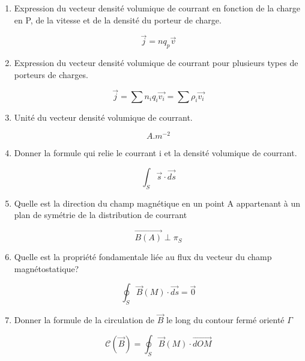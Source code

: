 \documentclass{article}
\begin{document}
\begin{enumerate}[label=\arabic{enumi} - , left=0pt, itemsep=1em]
    \item Expression du vecteur densité volumique de courrant en fonction de la charge en P, de la vitesse et de la densité du porteur de charge.\par
    \begin{solution}
         \[ \vec{j} = n q_p \vec{v} \]
    \end{solution}

    \item Expression du vecteur densité volumique de courrant pour plusieurs types de porteurs de charges.\par
    \begin{solution}
         \[ \vec{j} = \sum n_i q_i\vec{v_i} = \sum \rho_i\vec{v_i} \]
    \end{solution}

    \item Unité du vecteur densité volumique de courrant.\par
    \begin{solution}
         \[ A.m^{-2} \]
    \end{solution}

    \item Donner la formule qui relie le courrant i et la densité volumique de courrant.\par
    \begin{solution}
         \[ \int_S \vec{s} \cdot \vec{ds} \]
    \end{solution}

    \item Quelle est la direction du champ magnétique en un point A appartenant à un plan de symétrie de la distribution de courrant  \par
    \begin{solution}
         \[ \vec{B(A)} \perp \pi_S \]
    \end{solution}


    \item Quelle est la propriété fondamentale liée au flux du vecteur du champ magnétostatique?\par 
    \begin{solution}
         \[ \oint_S \vec{B}(M) \cdot \vec{ds} = \vec{0} \]
    \end{solution}

    \item Donner la formule de la circulation de $\vec{B}$ le long du contour fermé orienté $\Gamma$\par
    \begin{solution}
         \[ \mathscr{C}(\vec{B}) = \oint_S \vec{B}(M) \cdot \vec{dOM} \]
    \end{solution}


\end{enumerate}
\end{document}
